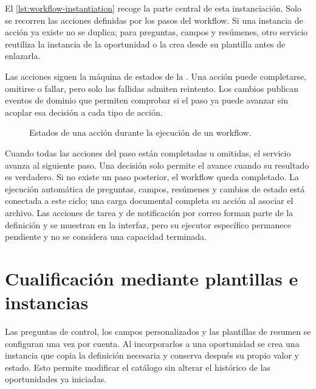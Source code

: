 El \cref{lst:workflow-instantiation} recoge la parte central de esta
instanciación. Solo se recorren las acciones definidas por los pasos del
workflow. Si una instancia de acción ya existe no se duplica; para preguntas,
campos y resúmenes, otro servicio reutiliza la instancia de la oportunidad o
la crea desde su plantilla antes de enlazarla.



Las acciones siguen la máquina de estados de la
. Una acción puede completarse, omitirse o
fallar, pero solo las fallidas admiten reintento. Los cambios publican eventos
de dominio que permiten comprobar si el paso ya puede avanzar sin acoplar esa
decisión a cada tipo de acción.

\begin{figure}[htbp]
  \centering
  \resizebox{0.9\textwidth}{!}{
    
  }
  \caption{Estados de una acción durante la ejecución de un workflow.}
  \label{fig:workflow-action-states}
\end{figure}

Cuando todas las acciones del paso están completadas u omitidas, el servicio
avanza al siguiente paso. Una decisión solo permite el avance cuando su
resultado es verdadero. Si no existe un paso posterior, el workflow queda
completado. La ejecución automática de preguntas, campos, resúmenes y cambios
de estado está conectada a este ciclo; una carga documental completa su acción
al asociar el archivo. Las acciones de tarea y de notificación por correo
forman parte de la definición y se muestran en la interfaz, pero su ejecutor
específico permanece pendiente y no se considera una capacidad terminada.

\section{Cualificación mediante plantillas e instancias}

Las preguntas de control, los campos personalizados y las plantillas de
resumen se configuran una vez por cuenta. Al incorporarlos a una oportunidad se
crea una instancia que copia la definición necesaria y conserva después su
propio valor y estado. Esto permite modificar el catálogo sin alterar el
histórico de las oportunidades ya iniciadas.

